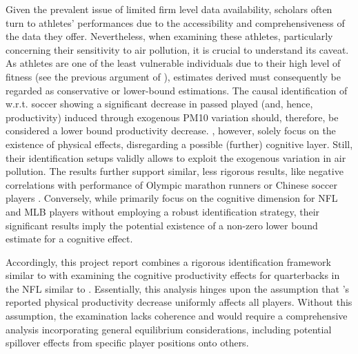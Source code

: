 \documentclass[12pt,a4paper]{article}
\begin{document}
Given the prevalent issue of limited firm level data availability, scholars often turn to athletes' performances due to the accessibility and comprehensiveness of the data they offer. Nevertheless, when examining these athletes, particularly concerning their sensitivity to air pollution, it is crucial to understand its caveat. As athletes are one of the least vulnerable individuals due to their high level of fitness (see the previous argument of \citealp{peled2011}),  estimates derived must consequently be regarded as conservative or lower-bound estimations. The causal identification of \citet{lichter2017} w.r.t. soccer showing a significant decrease in passed played (and, hence, productivity) induced through exogenous PM10 variation should, therefore, be considered a lower bound productivity decrease. \citet{lichter2017}, however, solely focus on the existence of physical effects, disregarding a possible (further) cognitive layer. Still, their identification setups validly allows to exploit the exogenous variation in air pollution. The results further support similar, less  rigorous results, like negative correlations with performance of Olympic marathon runners \citep{marr2010} or Chinese soccer players \citep{qin2022}. Conversely, while \citet{heintz2022} primarily focus on the cognitive dimension for NFL and MLB players without employing a robust identification strategy, their significant results imply the potential existence of a non-zero lower bound estimate for a cognitive effect. 

Accordingly, this project report combines a rigorous identification framework similar to \citet{lichter2017} with examining the cognitive productivity effects for quarterbacks in the NFL similar to \citet{heintz2022}. Essentially, this analysis hinges upon the assumption that \citeauthor{lichter2017}'s reported physical productivity decrease uniformly affects all players. Without this assumption, the examination lacks coherence and would require a comprehensive analysis incorporating general equilibrium considerations, including potential spillover effects from specific player positions onto others.
\end{document}
